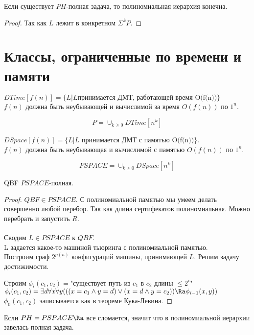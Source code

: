\begin{conseq}
Если существует $PH$-полная задача, то полиномиальная иерархия конечна. 
\end{conseq}
\begin{proof}
Так как $L$ лежит в конкретном $\Sigma^k P$.
\end{proof}
\section{Классы, ограниченные по времени и памяти}
\begin{Def}
$DTime[f(n)] = \{L| L\text{принимается ДМТ, работающей время O(f(n))}\}$\\
$f(n)$ должна быть неубывающей и вычислимой за время $O(f(n))$ по $1^n$.\\
\end{Def}
\begin{Rem}
$$P = \cup_{k \ge 0}DTime[n^k]$$
\end{Rem}
\begin{Def}
$DSpace[f(n)] = \{L|L\text{ принимается ДМТ с памятью O(f(n))}\}$.\\
$f(n)$ должна быть неубывающая и вычислимой с памятью $O(f(n))$ по $1^n$.
\end{Def}
\begin{Def}
$$PSPACE = \cup_{k \ge 0}DSpace[n^k]$$
\end{Def}
\begin{theorem}
QBF $PSPACE$-полная. 
\end{theorem}
\begin{proof}
$QBF \in  PSPACE$. 
С полиномиальной памятью мы умеем делать совершенно любой перебор. 
Так как длина сертифекатов полиномиальная. Можно перебрать и 
запустить $R$.\\                                
\\
Сводим $L \in PSPACE$ к $QBF$.\\
L задается какое-то машиной тьюринга с полиномиальной памятью.\\ 
Построим граф $2^{p(n)}$ конфигураций машины,
принимающей $L$. Решим задачу достижимости.

Строим $\phi_i(c_1, c_2) = $"существует путь из $c_1$ в $c_2$ длины $\le 2^i$"\\
$\phi_i(c_1, c_2) = \exists d \forall x \forall y(((x = c_1 \wedge y = d) \vee (x = d \wedge y = c_2)) \Ra \phi_{i - 1}(x, y))$\\
$\phi_0(c_1, c_2)$ записывается как в теореме Кука-Левина.  
\end{proof}
\begin{conseq}
Если $PH = PSPACE \Ra$ все сломается, значит
что в полиномиальной иерархии завелась полная задача. 
\end{conseq}